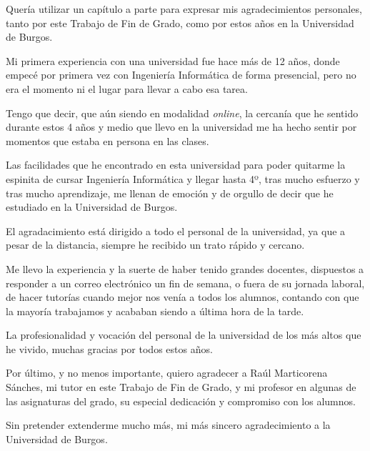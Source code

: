 
Quería utilizar un capítulo a parte para expresar mis agradecimientos personales, tanto por este Trabajo de Fin de Grado, como por estos años en la Universidad de Burgos.

Mi primera experiencia con una universidad fue hace más de 12 años, donde empecé por primera vez con Ingeniería Informática de forma presencial, pero no era el momento ni el lugar para llevar a cabo esa tarea.

Tengo que decir, que aún siendo en modalidad \textit{online}, la cercanía que he sentido durante estos 4 años y medio que llevo en la universidad me ha hecho sentir por momentos que estaba en persona en las clases.

Las facilidades que he encontrado en esta universidad para poder quitarme la espinita de cursar Ingeniería Informática y llegar hasta 4º, tras mucho esfuerzo y tras mucho aprendizaje, me llenan de emoción y de orgullo de decir que he estudiado en la Universidad de Burgos.

El agradacimiento está dirigido a todo el personal de la universidad, ya que a pesar de la distancia, siempre he recibido un trato rápido y cercano.

Me llevo la experiencia y la suerte de haber tenido grandes docentes, dispuestos a responder a un correo electrónico un fin de semana, o fuera de su jornada laboral, de hacer tutorías cuando mejor nos venía a todos los alumnos, contando con que la mayoría trabajamos y acababan siendo a última hora de la tarde.

La profesionalidad y vocación del personal de la universidad de los más altos que he vivido, muchas gracias por todos estos años.

Por último, y no menos importante, quiero agradecer a Raúl Marticorena Sánches, mi tutor en este Trabajo de Fin de Grado, y mi profesor en algunas de las asignaturas del grado, su especial dedicación y compromiso con los alumnos.

Sin pretender extenderme mucho más, mi más sincero agradecimiento a la Universidad de Burgos.


